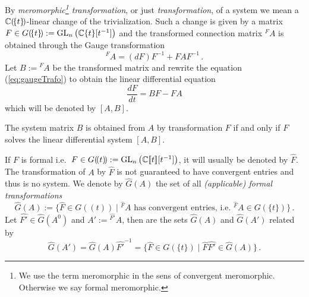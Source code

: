 By \emph{meromorphic\footnote{We use the term meromorphic in the sens of
convergent meromorphic. Otherwise we say formal meromorphic.} transformation},
or just \emph{transformation}, of a system we mean a $\mathbb{C}(\!\{t\}\!)$-linear
change of the trivialization.
Such a change is given by a matrix
$F\in G(\!\{t\}\!):=\operatorname{GL}_n\left(\mathbb{C}\{t\}[t^{-1}]\right)$ and the transformed
connection matrix ${}^F\!A$ is obtained through the Gauge transformation
\begin{equation}\label{eq:gaugeTrafo}
  {}^F\!A=(dF)F^{-1} + FAF^{-1} \,.
\end{equation}
Let $B:={}^F\!A$ be the transformed matrix and rewrite the equation
(\ref{eq:gaugeTrafo}) to obtain the linear differential equation
\[
    \frac{dF}{dt}=BF-FA
\]
which will be denoted by $[A,B]$.
\begin{rem}
  The system matrix $B$ is obtained from $A$ by transformation $F$ if and only
  if $F$ solves the linear differential system $[A,B]$.
\end{rem}

If $F$ is formal i.e.\
$F\in G(\!(t)\!):=\operatorname{GL}_n\left(\mathbb{C}\llbracket t\rrbracket[t^{-1}]\right)$, it will
usually be denoted by $\hat F$.
The transformation of $A$ by $\hat F$ is not guaranteed to have convergent
entries and thus is no system.
We denote by $\hat G(A)$ the set of all \emph{(applicable) formal
transformations}
\[
  \hat G(A):=\bigl\{\hat F\in G(\!(t)\!)
    \mid {}^{\hat F}\!A
    \text{ has convergent entries, i.e.\ ${}^{\hat F}\!A\in G(\!\{t\}\!)$}
  \bigr\}\,.
\]
Let $\hat{F'}\in\hat G(A^0)$ and $A':={}^{\hat{F'}}\!A$, then are the sets
$\hat G(A)$ and $\hat G(A')$ related by
\[
  \hat G(A')=\hat G(A)\hat{F'}^{-1}=\bigl\{
    \hat F\in G(\!\{t\}\!) \mid \hat F\hat{F'}\in\hat G(A)
  \bigr\} \,.
\]

